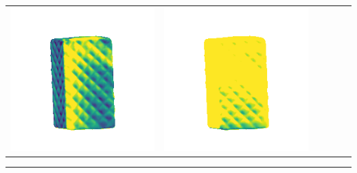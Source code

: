 \begin{center}
\begin{tabularx}{\linewidth}{@{}Y@{}Y@{}Y@{}Y@{}Y@{}Y@{}}
\includegraphics[width=\linewidth]{semisynthetic/20160617_18_marrnet_err.png} &
\includegraphics[width=\linewidth]{semisynthetic/20160617_18_ef_err.png} \\
\end{tabularx}
\begin{center}\rule{0.5\linewidth}{\linethickness}\end{center}


\end{center}
